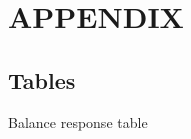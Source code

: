 \documentclass[11pt]{article}
\begin{document}
%    








\pagebreak





\setcounter{table}{0}
\renewcommand{\thetable}{A\arabic{table}}

\setcounter{figure}{0}
\renewcommand{\thefigure}{A\arabic{figure}}

\setcounter{section}{0}
\setcounter{subsection}{0}
\renewcommand\thesection{A\arabic{section}}
\renewcommand\thesubsection{\thesection\arabic{subsection}}

\appendix

\section{APPENDIX}

\subsection{Tables}


\begin{table}[H]
\caption{Balance response table}
\label{balance_response}
\begin{center}
\scriptsize{}
\end{center}
 \scriptsize
\end{table}
\end{document}
